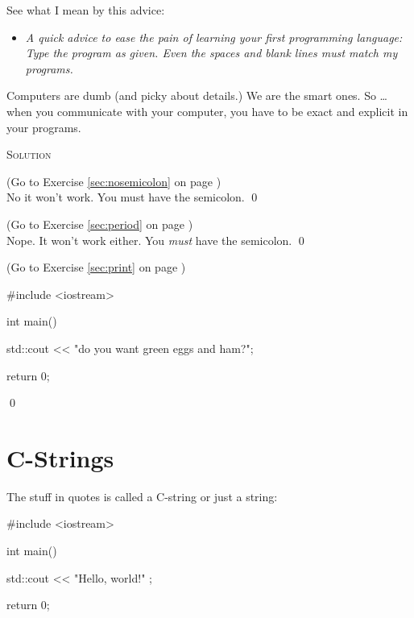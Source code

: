 


See what I mean by this advice:

\begin{itemize}
\item[]
\textit{A quick advice to ease the pain of learning your first programming 
language: Type the program 
 as given. 
Even the spaces and blank lines must match my programs.}
\end{itemize}

Computers are dumb (and picky about details.) 
We are the smart ones. So … when you communicate with your computer, 
you have to be exact and explicit in your programs.





\newpage\textsc{Solution}

\begin{soln}
\label{sec:nosemicolon_soln} 
(Go to Exercise \ref{sec:nosemicolon} 
on page \pageref{sec:nosemicolon})
\\
No it won't work. 
You must have the semicolon.
\qed
\end{soln}


\begin{soln}
\label{sec:period_soln} 
(Go to Exercise \ref{sec:period} 
on page \pageref{sec:period})
\\
Nope. It won't work either. 
You \textit{must} have the semicolon.
\qed
\end{soln}


\begin{soln}
\label{sec:print_soln} 
(Go to Exercise \ref{sec:print} 
on page \pageref{sec:print})
\begin{console}
#include <iostream>

int main()
{
    std::cout << "do you want green eggs and ham?\n";

    return 0;
}
\end{console}
\qed
\end{soln}





\newpage\section{C-Strings}

The stuff in quotes is called a C-string or just a string:
\begin{console}
#include <iostream>

int main()
{
    std::cout << "Hello, world!\n" ;

    return 0;
}
\end{console}

